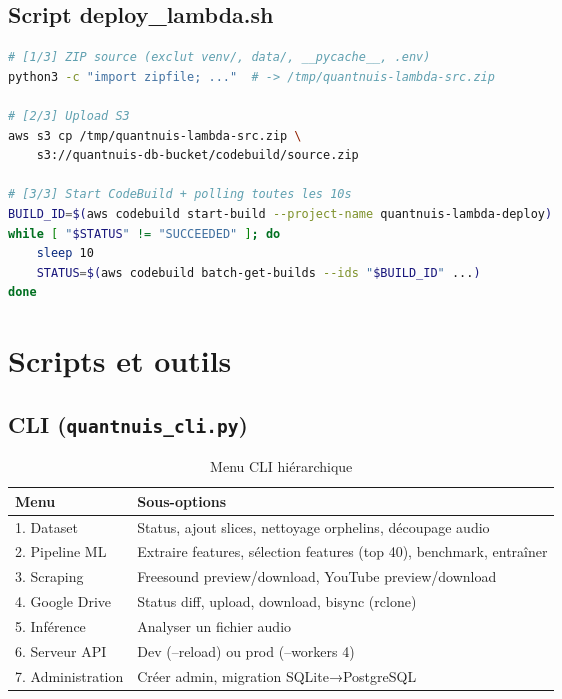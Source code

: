 \documentclass[11pt,a4paper]{article}
\begin{document}
\subsection{Script deploy\_lambda.sh}

\begin{lstlisting}[language=bash,caption={Deploy one-command}]
# [1/3] ZIP source (exclut venv/, data/, __pycache__, .env)
python3 -c "import zipfile; ..."  # -> /tmp/quantnuis-lambda-src.zip

# [2/3] Upload S3
aws s3 cp /tmp/quantnuis-lambda-src.zip \
    s3://quantnuis-db-bucket/codebuild/source.zip

# [3/3] Start CodeBuild + polling toutes les 10s
BUILD_ID=$(aws codebuild start-build --project-name quantnuis-lambda-deploy)
while [ "$STATUS" != "SUCCEEDED" ]; do
    sleep 10
    STATUS=$(aws codebuild batch-get-builds --ids "$BUILD_ID" ...)
done
\end{lstlisting}

\section{Scripts et outils}

\subsection{CLI (\texttt{quantnuis\_cli.py})}

\begin{table}[htbp]
\centering
\begin{tabular}{@{}lp{10cm}@{}}
\toprule
\textbf{Menu} & \textbf{Sous-options} \\
\midrule
1. Dataset & Status, ajout slices, nettoyage orphelins, découpage audio \\
2. Pipeline ML & Extraire features, sélection features (top 40), benchmark, entraîner \\
3. Scraping & Freesound preview/download, YouTube preview/download \\
4. Google Drive & Status diff, upload, download, bisync (rclone) \\
5. Inférence & Analyser un fichier audio \\
6. Serveur API & Dev (--reload) ou prod (--workers 4) \\
7. Administration & Créer admin, migration SQLite→PostgreSQL \\
\bottomrule
\end{tabular}
\caption{Menu CLI hiérarchique}
\end{table}
\end{document}
